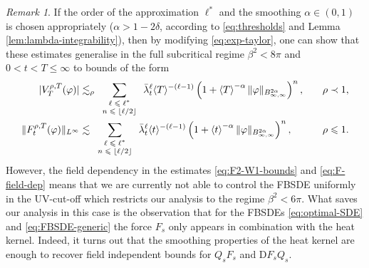 \documentclass[11pt, a4paper]{scrartcl}
\numberwithin{equation}{section}
\theoremstyle{plain}
\theoremstyle{remark}
\newtheorem{remark}[foo]{Remark}
\newcommand{\mathD}{\mathrm{D}}
\newcommand{\tmscript}[1]{\text{\scriptsize{$#1$}}}
\begin{document}
\begin{remark}
	\label{rem:b<gtr>6}If the order of the approximation $\ell^{\ast}$ and the
	smoothing $\alpha \in (0, 1)$ is chosen appropriately ($\alpha > 1 - 2
		\delta$, according to \eqref{eq:thresholds} and Lemma
	\ref{lem:lambda-integrability}), then by modifying \eqref{eq:exp-taylor},
	one can show that these estimates generalise in the full subcritical regime
	$\beta^2 < 8 \pi$  and $0 < t < T \leqslant \infty$ to bounds of the form
	\begin{equation}
		\begin{aligned}
			| V_T^{\rho, T} (\varphi) |                   & \lesssim_{\rho}
			\sum_{\tmscript{\begin{array}{c}
						                \ell \leqslant \ell^{\ast} \\
						                n \leqslant \lfloor{\ell / 2}\rfloor
					                \end{array}}} \bar{\lambda}_t^{\ell} \langle T \rangle^{- (\ell - 1)}  \left(
			1 + \left\langle T \right\rangle^{- \alpha} \| \varphi
			\|_{B_{\infty, \infty}^{2 \alpha}} \right)^n, & \quad \rho\prec1,     \\
			\| F_t^{\rho, T} (\varphi) \|_{L^{\infty}}    & \lesssim
			\sum_{\tmscript{\begin{array}{c}
						                \ell \leqslant \ell^{\ast} \\
						                n \leqslant \lfloor{\ell / 2}\rfloor
					                \end{array}}} \bar{\lambda}_t^{\ell} \langle t \rangle^{- (\ell - 1)}  \left(
			1 + \left\langle t \right\rangle^{- \alpha} \| \varphi
			\|_{B_{\infty, \infty}^{2 \alpha}} \right)^n, & \quad \rho\leqslant1.
		\end{aligned} \label{eq:F-field-dep}
	\end{equation}
	However, the field dependency in the estimates \eqref{eq:F2-W1-bounds} and
	\eqref{eq:F-field-dep} means that we are currently not able to control the
	FBSDE uniformly in the UV-cut-off which restricts our analysis to the regime
	$\beta^2 < 6 \pi$. What saves our analysis in this case is the observation
	that for the FBSDEs \eqref{eq:optimal-SDE} and \eqref{eq:FBSDE-generic} the
	force $F_s$ only appears in combination with the heat kernel. Indeed, it
	turns out that the smoothing
	properties of the heat kernel are enough to recover field independent bounds for $Q_s
		F_s$ and $\mathD F_s Q_s$.
\end{remark}
\end{document}
